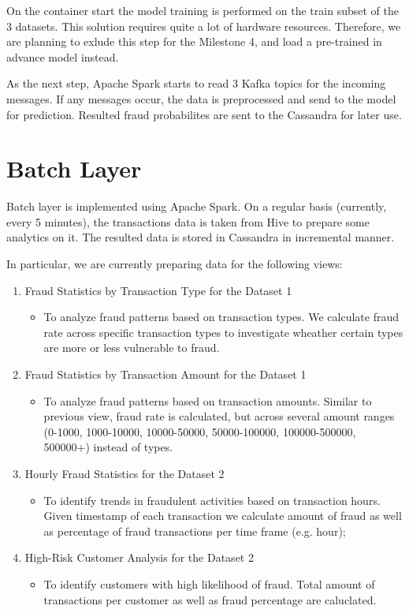 \documentclass[12pt,a4paper, hidelinks]{article}
\begin{document}
On the container start the model training is performed on the train subset of the 3 datasets. This solution requires quite a lot of hardware resources. Therefore, we are planning to exlude this step for the Milestone 4, and load a pre-trained in advance model instead.

As the next step, Apache Spark starts to read 3 Kafka topics for the incoming messages. If any messages occur, the data is preprocessed and send to the model for prediction. Resulted fraud probabilites are sent to the Cassandra for later use.

\section{Batch Layer}

Batch layer is implemented using Apache Spark. On a regular basis (currently, every 5 minutes), the transactions data is taken from Hive to prepare some analytics on it. The resulted data is stored in Cassandra in incremental manner.

In particular, we are currently preparing data for the following views:
\begin{enumerate}
    \item Fraud Statistics by Transaction Type for the Dataset 1
    \begin{itemize}
        \item To analyze fraud patterns based on transaction types. We calculate fraud rate across specific transaction types to investigate wheather certain types are more or less vulnerable to fraud.
    \end{itemize}
    \item Fraud Statistics by Transaction Amount for the Dataset 1
    \begin{itemize}
        \item To analyze fraud patterns based on transaction amounts. Similar to previous view, fraud rate is calculated, but across several amount ranges (0-1000, 1000-10000, 10000-50000, 50000-100000, 100000-500000, 500000+) instead of types.
    \end{itemize}
    \item Hourly Fraud Statistics for the Dataset 2
    \begin{itemize}
        \item To identify trends in fraudulent activities based on transaction hours. Given timestamp of each transaction we calculate amount of fraud as well as percentage of fraud transactions per time frame (e.g. hour);
    \end{itemize}
    \item High-Risk Customer Analysis for the Dataset 2
    \begin{itemize}
        \item To identify customers with high likelihood of fraud. Total amount of transactions per customer as well as fraud percentage are caluclated.
    \end{itemize}
\end{enumerate}
\end{document}
